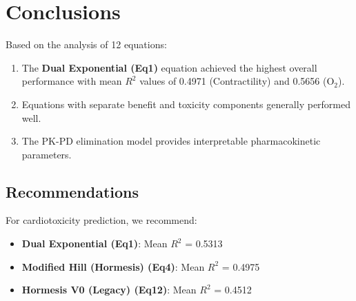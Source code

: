 \documentclass[11pt,a4paper]{article}
\begin{document}
\newpage

\section{Conclusions}

Based on the analysis of 12 equations:

\begin{enumerate}
    \item The \textbf{Dual Exponential (Eq1)} equation achieved the highest overall performance with mean $R^2$ values of 0.4971 (Contractility) and 0.5656 (O$_2$).
    \item Equations with separate benefit and toxicity components generally performed well.
    \item The PK-PD elimination model provides interpretable pharmacokinetic parameters.
\end{enumerate}

\subsection{Recommendations}

For cardiotoxicity prediction, we recommend:
\begin{itemize}
    \item \textbf{Dual Exponential (Eq1)}: Mean $R^2$ = 0.5313
    \item \textbf{Modified Hill (Hormesis) (Eq4)}: Mean $R^2$ = 0.4975
    \item \textbf{Hormesis V0 (Legacy) (Eq12)}: Mean $R^2$ = 0.4512

\end{itemize}
\end{document}
